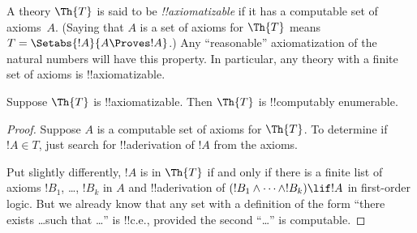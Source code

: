 \documentclass[../../../include/open-logic-section]{subfiles}
\begin{document}


A theory $\Th{T}$ is said to be \emph{!!{axiomatizable}} if it has a
computable set of axioms~$A$. (Saying that $A$ is a set of axioms for
$\Th{T}$ means $T = \Setabs{!A}{A \Proves !A}$.) Any ``reasonable''
axiomatization of the natural numbers will have this property. In
particular, any theory with a finite set of axioms is
!!{axiomatizable}.

\begin{lem}
Suppose $\Th{T}$ is !!{axiomatizable}. Then $\Th{T}$ is !!{computably
enumerable}.
\end{lem}

\begin{proof}
Suppose $A$ is a computable set of axioms for $\Th{T}$. To determine
if $!A \in T$, just search for !!a{derivation} of $!A$ from the axioms.

Put slightly differently, $!A$ is in $\Th{T}$ if and only if there is
a finite list of axioms $!B_1$, \dots, $!B_k$ in $A$ and !!a{derivation} of
$(!B_1 \land \dots \land !B_k) \lif !A$ in first-order logic.  But
we already know that any set with a definition of the form ``there
exists \dots such that \dots'' is !!{c.e.}, provided the second ``\dots''
is computable.
\end{proof}
\end{document}
